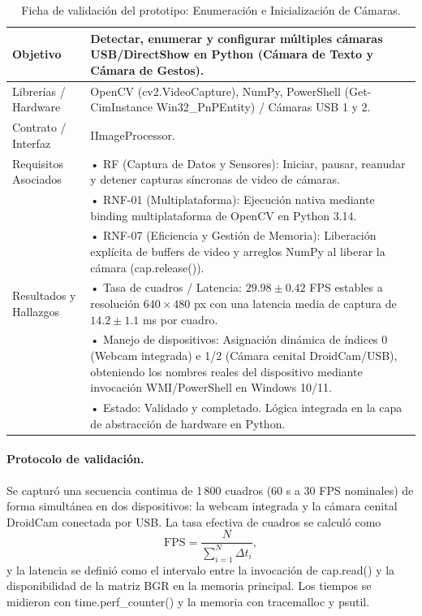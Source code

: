 \begin{table}[H]
    \centering
    \caption{Ficha de validación del prototipo: Enumeración e Inicialización de Cámaras.}
    \label{tab:ficha_camaras}
    \begin{tabular}{L{3.2cm} L{11.0cm}}
        \toprule
        Objetivo & Detectar, enumerar y configurar múltiples cámaras USB/DirectShow en Python (Cámara de Texto y Cámara de Gestos). \\ \midrule
        Librerías / Hardware & OpenCV (cv2.VideoCapture), NumPy, PowerShell (Get-CimInstance Win32\_PnPEntity) / Cámaras USB 1 y 2. \\ \midrule
        Contrato / Interfaz & IImageProcessor. \\ \midrule
        Requisitos Asociados &
        • RF (Captura de Datos y Sensores): Iniciar, pausar, reanudar y detener capturas síncronas de video de cámaras. \vspace{0.1cm} \\
        & • RNF-01 (Multiplataforma): Ejecución nativa mediante binding multiplataforma de OpenCV en Python 3.14. \vspace{0.1cm} \\
        & • RNF-07 (Eficiencia y Gestión de Memoria): Liberación explícita de buffers de video y arreglos NumPy al liberar la cámara (cap.release()). \\ \midrule
        Resultados y Hallazgos &
        • Tasa de cuadros / Latencia: $29.98 \pm 0.42$ FPS estables a resolución $640\times480$ px con una latencia media de captura de $14.2 \pm 1.1$ ms por cuadro. \vspace{0.1cm} \\
        & • Manejo de dispositivos: Asignación dinámica de índices 0 (Webcam integrada) e 1/2 (Cámara cenital DroidCam/USB), obteniendo los nombres reales del dispositivo mediante invocación WMI/PowerShell en Windows 10/11. \vspace{0.1cm} \\
        & • Estado: Validado y completado. Lógica integrada en la capa de abstracción de hardware en Python. \\ \bottomrule
    \end{tabular}
\end{table}
 
\paragraph{Protocolo de validación.} Se capturó una secuencia continua de 1\,800 cuadros (60 s a 30 FPS nominales) de forma simultánea en dos dispositivos: la webcam integrada y la cámara cenital DroidCam conectada por USB. La tasa efectiva de cuadros se calculó como
\[ \mathrm{FPS} = \frac{N}{\sum_{i=1}^{N} \Delta t_i}, \]
y la latencia se definió como el intervalo entre la invocación de cap.read() y la disponibilidad de la matriz BGR en la memoria principal. Los tiempos se midieron con time.perf\_counter() y la memoria con tracemalloc y psutil.
 
